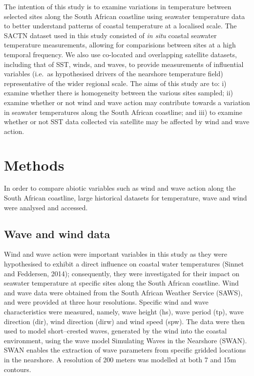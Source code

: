 \documentclass[12pt,a4paper,]{article}
\begin{document}
The intention of this study is to examine variations in temperature
between selected sites along the South African coastline using seawater
temperature data to better understand patterns of coastal temperature at
a localised scale. The SACTN dataset used in this study consisted of
\emph{in situ} coastal seawater temperature measurements, allowing for
comparisions between sites at a high temporal frequency. We also use
co-located and overlapping satellite datasets, including that of SST,
winds, and waves, to provide measurements of influential variables
(i.e.~as hypothesised drivers of the nearshore temperature field)
representative of the wider regional scale. The aims of this study are
to: i) examine whether there is homogeneity between the various sites
sampled; ii) examine whether or not wind and wave action may contribute
towards a variation in seawater temperatures along the South African
coastline; and iii) to examine whether or not SST data collected via
satellite may be affected by wind and wave action.

\hypertarget{methods}{%
\section{Methods}\label{methods}}

In order to compare abiotic variables such as wind and wave action along
the South African coastline, large historical datasets for temperature,
wave and wind were analysed and accessed.

\hypertarget{wave-and-wind-data}{%
\subsection{Wave and wind data}\label{wave-and-wind-data}}

Wind and wave action were important variables in this study as they were
hypothesised to exhibit a direct influence on coastal water temperatures
(Sinnet and Feddersen, 2014); consequently, they were investigated for
their impact on seawater temperature at specific sites along the South
African coastline. Wind and wave data were obtained from the South
African Weather Service (SAWS), and were provided at three hour
resolutions. Specific wind and wave characteristics were measured,
namely, wave height (hs), wave period (tp), wave direction (dir), wind
direction (dirw) and wind speed (spw). The data were then used to model
short--crested waves, generated by the wind into the coastal
environment, using the wave model Simulating Waves in the Nearshore
(SWAN). SWAN enables the extraction of wave parameters from specific
gridded locations in the nearshore. A resolution of 200 meters was
modelled at both 7 and 15m contours.
\end{document}
